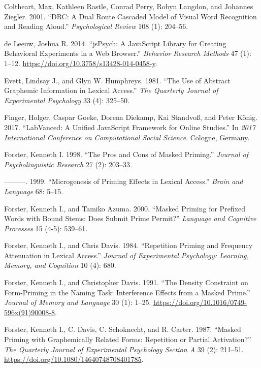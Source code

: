 \documentclass[
]{interact}
\newlength{\cslhangindent}
\newenvironment{CSLReferences}[2] %
 {\begin{list}{}{%
  \setlength{\itemindent}{0pt}
  \setlength{\leftmargin}{0pt}
  \setlength{\parsep}{0pt}
  \ifodd #1
   \setlength{\leftmargin}{\cslhangindent}
   \setlength{\itemindent}{-1\cslhangindent}
  \fi
  \setlength{\itemsep}{#2\baselineskip}}}
 {\end{list}}
\begin{document}
\begin{CSLReferences}{1}{0}
Coltheart, Max, Kathleen Rastle, Conrad Perry, Robyn Langdon, and
Johannes Ziegler. 2001. {``DRC: A Dual Route Cascaded Model of Visual
Word Recognition and Reading Aloud.''} \emph{Psychological Review} 108
(1): 204--56.

de Leeuw, Joshua R. 2014. {``jsPsych: A JavaScript Library for Creating
Behavioral Experiments in a Web Browser.''} \emph{Behavior Research
Methods} 47 (1): 1--12. \url{https://doi.org/10.3758/s13428-014-0458-y}.

Evett, Lindsay J., and Glyn W. Humphreys. 1981. {``The Use of Abstract
Graphemic Information in Lexical Access.''} \emph{The Quarterly Journal
of Experimental Psychology} 33 (4): 325--50.

Finger, Holger, Caspar Goeke, Dorena Diekamp, Kai Standvoß, and Peter
König. 2017. {``LabVanced: A Unified JavaScript Framework for Online
Studies.''} In \emph{2017 International Conference on Computational
Social Science}. Cologne, Germany.

Forster, Kenneth I. 1998. {``The Pros and Cons of Masked Priming.''}
\emph{Journal of Psycholinguistic Research} 27 (2): 203--33.

---------. 1999. {``Microgenesis of Priming Effects in Lexical
Access.''} \emph{Brain and Language} 68: 5--15.

Forster, Kenneth I., and Tamiko Azuma. 2000. {``Masked Priming for
Prefixed Words with Bound Stems: Does Submit Prime Permit?''}
\emph{Language and Cognitive Processes} 15 (4-5): 539--61.

Forster, Kenneth I., and Chris Davis. 1984. {``Repetition Priming and
Frequency Attenuation in Lexical Access.''} \emph{Journal of
Experimental Psychology: Learning, Memory, and Cognition} 10 (4): 680.

Forster, Kenneth I., and Christopher Davis. 1991. {``The Density
Constraint on Form-Priming in the Naming Task: Interference Effects from
a Masked Prime.''} \emph{Journal of Memory and Language} 30 (1): 1--25.
\url{https://doi.org/10.1016/0749-596x(91)90008-8}.

Forster, Kenneth I., C. Davis, C. Schoknecht, and R. Carter. 1987.
{``Masked Priming with Graphemically Related Forms: Repetition or
Partial Activation?''} \emph{The Quarterly Journal of Experimental
Psychology Section A} 39 (2): 211--51.
\url{https://doi.org/10.1080/14640748708401785}.


\end{CSLReferences}
\end{document}
